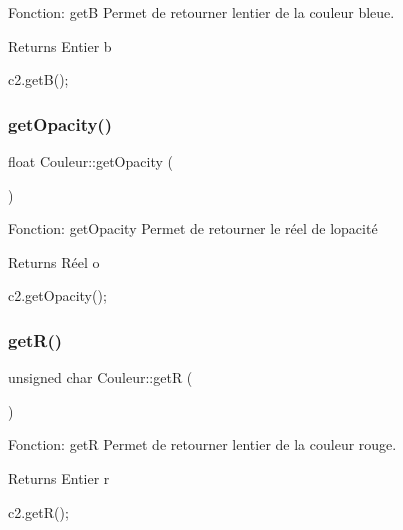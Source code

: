 Fonction\+: getB Permet de retourner l\textquotesingle{}entier de la couleur bleue. 

\begin{DoxyReturn}{Returns}
Entier b 
\begin{DoxyCode}
c2.getB();
\end{DoxyCode}
 
\end{DoxyReturn}
\mbox{\label{classCouleur_afb394e815103a2245bc5c3b5b513f05b}} 
\subsubsection{\texorpdfstring{get\+Opacity()}{getOpacity()}}
{\footnotesize\ttfamily float Couleur\+::get\+Opacity (\begin{DoxyParamCaption}{ }\end{DoxyParamCaption})}



Fonction\+: get\+Opacity Permet de retourner le réel de l\textquotesingle{}opacité 

\begin{DoxyReturn}{Returns}
Réel o 
\begin{DoxyCode}
c2.getOpacity();
\end{DoxyCode}
 
\end{DoxyReturn}
\mbox{\label{classCouleur_aa3d10f39d94ed884dda69a2420cd3357}} 
\subsubsection{\texorpdfstring{get\+R()}{getR()}}
{\footnotesize\ttfamily unsigned char Couleur\+::getR (\begin{DoxyParamCaption}{ }\end{DoxyParamCaption})}



Fonction\+: getR Permet de retourner l\textquotesingle{}entier de la couleur rouge. 

\begin{DoxyReturn}{Returns}
Entier r 
\begin{DoxyCode}
c2.getR();
\end{DoxyCode}
 
\end{DoxyReturn}
\mbox{\label{classCouleur_a15c9bd61ea816ad1fb9a7e13806142c7}} 
